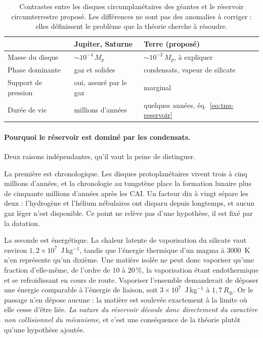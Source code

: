 \documentclass[11pt,a4paper,openany]{report}
\newcommand{\Rt}{R_{\oplus}}
\begin{document}
\begin{table}[htbp]
\centering
\small
\caption{Contrastes entre les disques circumplanétaires des géantes et le réservoir
circumterrestre proposé. Les différences ne sont pas des anomalies à corriger : elles définissent
le problème que la théorie cherche à résoudre.}
\label{tab:contraste-disques}
\begin{tabularx}{\textwidth}{>{\raggedright\arraybackslash}p{4.2cm}
>{\raggedright\arraybackslash}X >{\raggedright\arraybackslash}X}
\toprule
 & \textbf{Jupiter, Saturne} & \textbf{Terre (proposé)} \\
\midrule
Masse du disque & $\sim10^{-4}\,M_p$ & $\sim10^{-2}\,M_p$, à expliquer \\[3pt]
Phase dominante & gaz et solides & condensats, vapeur de silicate \\[3pt]
Support de pression & oui, assuré par le gaz & marginal \\[3pt]
Durée de vie & millions d'années & quelques années, éq.~\eqref{eq:tnu-reservoir} \\
\bottomrule
\end{tabularx}
\end{table}


\paragraph{Pourquoi le réservoir est dominé par les condensats.} Deux raisons indépendantes, qu'il
vaut la peine de distinguer.

La première est chronologique. Les disques protoplanétaires vivent trois à cinq millions d'années,
et la chronologie au tungstène place la formation lunaire plus de cinquante millions d'années après
les CAI. Un facteur dix à vingt sépare les deux : l'hydrogène et l'hélium nébulaires ont disparu
depuis longtemps, et aucun gaz léger n'est disponible. Ce point ne relève pas d'une hypothèse, il
est fixé par la datation.

La seconde est énergétique. La chaleur latente de vaporisation du silicate vaut environ
$1{,}2\times10^{7}$~J\,kg$^{-1}$, tandis que l'énergie thermique d'un magma à $3000$~K n'en
représente qu'un dixième. Une matière isolée ne peut donc vaporiser qu'une fraction d'elle-même,
de l'ordre de $10$ à $20\,\%$, la vaporisation étant endothermique et se refroidissant en cours de
route. Vaporiser l'ensemble demanderait de déposer une énergie comparable à l'énergie de liaison,
soit $3\times10^{7}$~J\,kg$^{-1}$ à $1{,}7\,\Rt$. Or le passage n'en dépose aucune : la matière est
soulevée exactement à la limite où elle cesse d'être liée. \emph{La nature du réservoir découle donc
directement du caractère non collisionnel du mécanisme}, et c'est une conséquence de la théorie
plutôt qu'une hypothèse ajoutée.
\end{document}
